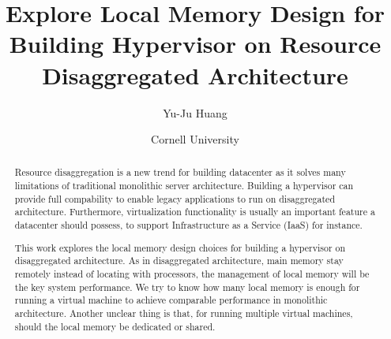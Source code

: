 \documentclass[twocolumn]{article}
\title{Explore Local Memory Design for Building Hypervisor on Resource Disaggregated Architecture}
\author{Yu-Ju Huang}
\date{Cornell University}
\begin{document}
\maketitle

\begin{abstract}
Resource disaggregation is a new trend for building datacenter as it solves many limitations of traditional monolithic server architecture. Building a hypervisor can provide full compability to enable legacy applications to run on disaggregated architecture. Furthermore, virtualization functionality is usually an important feature a datacenter should possess, to support Infrastructure as a Service (IaaS) for instance.

This work explores the local memory design choices for building a hypervisor on disaggregated architecture. As in disaggregated architecture, main memory stay remotely instead of locating with processors, the management of local memory will be the key system performance. We try to know how many local memory is enough for running a virtual machine to achieve comparable performance in monolithic architecture. Another unclear thing is that, for running multiple virtual machines, should the local memory be dedicated or shared.

\end{abstract}

\iffalse
\begin{figure*}[h!]
  \subcaptionbox{Monolithic architecture, hardware components are bounded within a machine.\label{fig:monolithic}}[.3\textwidth]{\texttt{[image: figures/monolithic.png]}}
  \subcaptionbox{Disaggregated architecture, hardware components are separate: there are CPU-blade, memory-blade, storage-blade. We also assume there is local memory located with CPU.\label{fig:disaggregated}}[.7\textwidth]{\texttt{[image: figures/disaggregated.png]}}
  \caption{Monolithic architecture and disaggregated architecture.}
  \label{fig:architecture}
\end{figure*}
\fi
\end{document}
